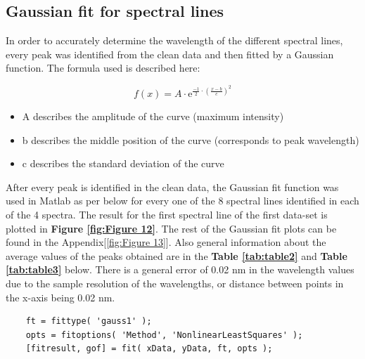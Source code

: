\subsection{Gaussian fit for spectral lines}
In order to accurately determine the wavelength of the different spectral lines, every peak was identified from the clean data and then fitted by a Gaussian\cite{Gaussian} function. The formula used is described here:

\begin{equation} \label{eqn}
	f(x)=A\cdot \mathrm{e}_{}^{\frac{-1}{2}\cdot\left( \frac{x-b}{c} \right)^{2}}
\end{equation}

\begin{itemize}
    \item A describes the amplitude of the curve (maximum intensity)
    \item b describes the middle position of the curve (corresponds to peak wavelength)
    \item c describes the standard deviation of the curve
\end{itemize}

After every peak is identified in the clean data, the Gaussian fit function was used in Matlab as per below for every one of the 8 spectral lines identified in each of the 4 spectra. The result for the first spectral line of the first data-set is plotted in \textbf{Figure \ref{fig:Figure 12}}. The rest of the Gaussian fit plots can be found in the Appendix[\ref{fig:Figure 13}]. Also general information about the average values of the peaks obtained are in the \textbf{Table \ref{tab:table2}} and\textbf{ Table \ref{tab:table3}} below. There is a general error of 0.02 nm in the wavelength values due to the sample resolution of the wavelengths, or distance between points in the x-axis being 0.02 nm.

\begin{lstlisting}
    ft = fittype( 'gauss1' );
    opts = fitoptions( 'Method', 'NonlinearLeastSquares' );
    [fitresult, gof] = fit( xData, yData, ft, opts );
\end{lstlisting}

